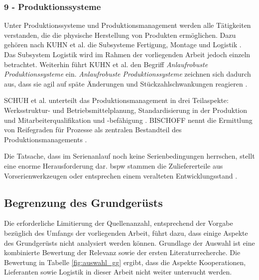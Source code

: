\subsubsection*{9 - Produktionssysteme}
Unter Produktionssysteme und Produktionsmanagement werden alle Tätigkeiten verstanden, die die physische Herstellung von Produkten ermöglichen. Dazu gehören nach KUHN et al. die Subsysteme Fertigung, Montage und Logistik \autocite{Kuhn2002}. Das Subsystem Logistik wird im Rahmen der vorliegenden Arbeit jedoch einzeln betrachtet. Weiterhin führt KUHN et al. den Begriff \textit{Anlaufrobuste Produktionssysteme} ein. \textit{Anlaufrobuste Produktionssysteme} zeichnen sich dadurch aus, dass sie agil auf späte Änderungen und Stückzahlschwankungen reagieren \autocite[20]{Bischoff2007}. 

SCHUH et al. unterteilt das Produktionsmanagement in drei Teilaspekte: Werksstruktur- und Betriebsmittelplanung, Standardisierung in der Produktion und Mitarbeiterqualifikation und -be\-fä\-hi\-gung \autocite[177]{Schuh2008}. 
BISCHOFF nennt die Ermittlung von Reifegraden für Prozesse als zentralen Bestandteil des Produktionsmanagements \autocite[20]{Bischoff2007}. 

Die Tatsache, dass im Serienanlauf noch keine Serienbedingungen herrschen, stellt eine enorme Herausforderung dar. \Gls{bspw} stammen die Zuliefererteile aus Vorserienwerkzeugen oder entsprechen einem veralteten Entwicklungsstand \autocite[21]{Kuhn2002}.

\subsection*{Begrenzung des Grundgerüsts}
Die erforderliche Limitierung der Quellenanzahl, entsprechend der Vorgabe bezüglich des Umfangs der vorliegenden Arbeit, führt dazu, dass einige Aspekte des Grundgerüsts nicht analysiert werden können.
Grundlage der Auswahl ist eine kombinierte Bewertung der Relevanz sowie der ersten Literaturrecherche. 
Die Bewertung in Tabelle \ref{fig:auswahl_gg} ergibt, dass die Aspekte Kooperationen, Lieferanten sowie Logistik in dieser Arbeit nicht weiter untersucht werden. 

